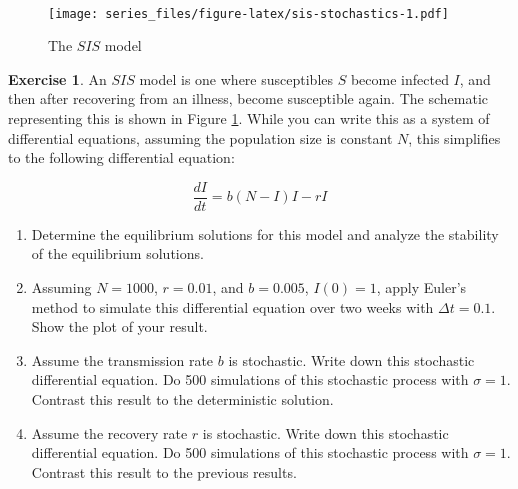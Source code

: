 \documentclass[
]{book}
\theoremstyle{definition}
\theoremstyle{definition}
\theoremstyle{definition}
\newtheorem{exercise}{Exercise}[chapter]
\theoremstyle{remark}
\begin{document}
~

\begin{figure}
\centering
\texttt{[image: series\_files/figure-latex/sis-stochastics-1.pdf]}
\caption{\label{fig:sis-stochastics}The \(SIS\) model}
\end{figure}

\begin{exercise}
\protect\hypertarget{exr:unnamed-chunk-344}{}{\label{exr:unnamed-chunk-344} }An \(SIS\) model is one where susceptibles \(S\) become infected \(I\), and then after recovering from an illness, become susceptible again. The schematic representing this is shown in Figure \ref{fig:sis-stochastics}. While you can write this as a system of differential equations, assuming the population size is constant \(N\), this simplifies to the following differential equation:

\begin{equation}
\frac{dI}{dt} = b(N-I) I - r I
\end{equation}

\begin{enumerate}[label=\alph*.]
\item Determine the equilibrium solutions for this model and analyze the stability of the equilibrium solutions.
\item Assuming $N=1000$, $r=0.01$, and $b=0.005$, $I(0)=1$, apply Euler's method to simulate this differential equation over two weeks with $\Delta t = 0.1$.  Show the plot of your result.
\item Assume the transmission rate $b$ is stochastic.  Write down this stochastic differential equation.  Do 500 simulations of this stochastic process with $\sigma = 1$.  Contrast this result to the deterministic solution.
\item Assume the recovery rate $r$ is stochastic.  Write down this stochastic differential equation.  Do 500 simulations of this stochastic process with $\sigma = 1$.  Contrast this result to the previous results.
\end{enumerate}
\end{exercise}

~
\end{document}
